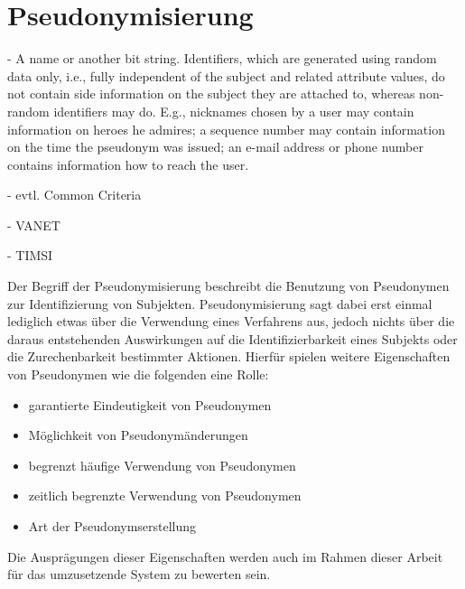\section{Pseudonymisierung}

\label{sec_state_pseudonymity}

- A name or another bit string. Identifiers, which are generated using random data only, i.e., fully 
independent of the subject and related attribute values, do not contain side information on the 
subject they are attached to, whereas non-random identifiers may do. E.g., nicknames chosen by 
a user may contain information on heroes he admires; a sequence number may contain 
information on the time the pseudonym was issued; an e-mail address or phone number contains 
information how to reach the user.  \cite{pfitzmann2010}

- evtl. Common Criteria

- VANET

- TIMSI

Der Begriff der Pseudonymisierung beschreibt die Benutzung von Pseudonymen zur Identifizierung von Subjekten. Pseudonymisierung sagt dabei erst einmal lediglich etwas über die Verwendung eines Verfahrens aus, jedoch nichts über die daraus entstehenden Auswirkungen auf die Identifizierbarkeit eines Subjekts oder die Zurechenbarkeit bestimmter Aktionen. Hierfür spielen weitere Eigenschaften von Pseudonymen wie die folgenden eine Rolle:
\begin{itemize}
  \item garantierte Eindeutigkeit von Pseudonymen
  \item Möglichkeit von Pseudonymänderungen
  \item begrenzt häufige Verwendung von Pseudonymen 
  \item zeitlich begrenzte Verwendung von Pseudonymen
  \item Art der Pseudonymserstellung
\end{itemize}

Die Ausprägungen dieser Eigenschaften werden auch im Rahmen dieser Arbeit für das umzusetzende System zu bewerten sein.